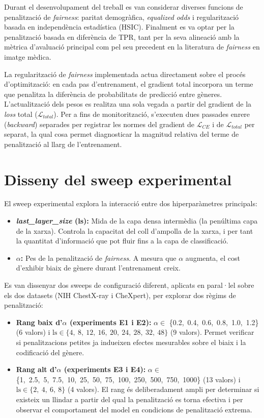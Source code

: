 \documentclass[a4paper,12pt,twoside]{ThesisStyle}
\begin{document}
Durant el desenvolupament del treball es van considerar diverses funcions de penalització de \textit{fairness}: paritat demogràfica, \textit{equalized odds} i regularització basada en independència estadística (HSIC). Finalment es va optar per la penalització basada en diferència de TPR, tant per la seva alineació amb la mètrica d'avaluació principal com pel seu precedent en la literatura de \textit{fairness} en imatge mèdica.

La regularització de \textit{fairness} implementada actua directament sobre el procés d'optimització: en cada pas d'entrenament, el gradient total incorpora un terme que penalitza la diferència de probabilitats de predicció entre gèneres. L'actualització dels pesos es realitza una sola vegada a partir del gradient de la \textit{loss} total ($\mathcal{L}_{total}$). Per a fins de monitorització, s'executen dues passades enrere (\textit{backward}) separades per registrar les normes del gradient de $\mathcal{L}_{CE}$ i de $\mathcal{L}_{total}$ per separat, la qual cosa permet diagnosticar la magnitud relativa del terme de penalització al llarg de l'entrenament.

\section{Disseny del sweep experimental}

El sweep experimental explora la interacció entre dos hiperparàmetres principals:

\begin{itemize}
    \item \textbf{\textit{last\_layer\_size} (ls):} Mida de la capa densa intermèdia (la penúltima capa de la xarxa). Controla la capacitat del coll d'ampolla de la xarxa, i per tant la quantitat d'informació que pot fluir fins a la capa de classificació.
    \item \textbf{$\alpha$:} Pes de la penalització de \textit{fairness}. A mesura que $\alpha$ augmenta, el cost d'exhibir biaix de gènere durant l'entrenament creix.
\end{itemize}

Es van dissenyar dos sweeps de configuració diferent, aplicats en paral·lel sobre els dos datasets (NIH ChestX-ray i CheXpert), per explorar dos règims de penalització:

\begin{itemize}
    \item \textbf{Rang baix d'$\alpha$ (experiments E1 i E2):} $\alpha \in$ \{0.2,\ 0.4,\ 0.6,\ 0.8,\ 1.0,\ 1.2\} (6 valors) i $\text{ls} \in \{4,\ 8,\ 12,\ 16,\ 20,\ 24,\ 28,\ 32,\ 48\}$ (9 valors). Permet verificar si penalitzacions petites ja indueixen efectes mesurables sobre el biaix i la codificació del gènere.
    \item \textbf{Rang alt d'$\alpha$ (experiments E3 i E4):} $\alpha \in$ \{1,\ 2.5,\ 5,\ 7.5,\ 10,\ 25,\ 50,\ 75,\ 100,\ 250,\ 500,\ 750,\ 1000\} (13 valors) i $\text{ls} \in \{2,\ 4,\ 6,\ 8\}$ (4 valors). El rang és deliberadament ampli per determinar si existeix un llindar a partir del qual la penalització es torna efectiva i per observar el comportament del model en condicions de penalització extrema.
\end{itemize}
\end{document}
